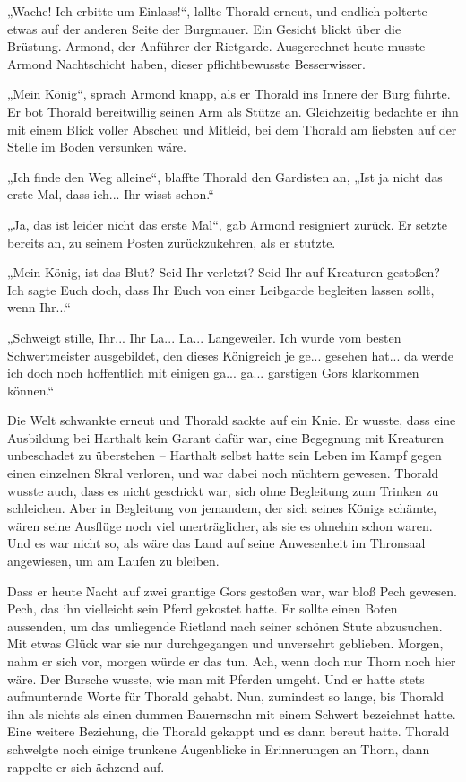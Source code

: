 \documentclass[10pt, a4paper, oneside]{book}
\begin{document}
„Wache! Ich erbitte um Einlass!“, lallte Thorald erneut, und endlich polterte etwas auf der anderen Seite der Burgmauer. Ein Gesicht blickt über die Brüstung. Armond, der Anführer der Rietgarde. Ausgerechnet heute musste Armond Nachtschicht haben, dieser pflichtbewusste Besserwisser.

„Mein König“, sprach Armond knapp, als er Thorald ins Innere der Burg führte. Er bot Thorald bereitwillig seinen Arm als Stütze an. Gleichzeitig bedachte er ihn mit einem Blick voller Abscheu und Mitleid, bei dem Thorald am liebsten auf der Stelle im Boden versunken wäre.

„Ich finde den Weg alleine“, blaffte Thorald den Gardisten an, „Ist ja nicht das erste Mal, dass ich... Ihr wisst schon.“

„Ja, das ist leider nicht das erste Mal“, gab Armond resigniert zurück. Er setzte bereits an, zu seinem Posten zurückzukehren, als er stutzte.

„Mein König, ist das Blut? Seid Ihr verletzt? Seid Ihr auf Kreaturen gestoßen? Ich sagte Euch doch, dass Ihr Euch von einer Leibgarde begleiten lassen sollt, wenn Ihr...“

„Schweigt stille, Ihr... Ihr La... La... Langeweiler. Ich wurde vom besten Schwertmeister ausgebildet, den dieses Königreich je ge... gesehen hat... da werde ich doch noch hoffentlich mit einigen ga... ga... garstigen Gors klarkommen können.“

Die Welt schwankte erneut und Thorald sackte auf ein Knie. Er wusste, dass eine Ausbildung bei Harthalt kein Garant dafür war, eine Begegnung mit Kreaturen unbeschadet zu überstehen – Harthalt selbst hatte sein Leben im Kampf gegen einen einzelnen Skral verloren, und war dabei noch nüchtern gewesen. Thorald wusste auch, dass es nicht geschickt war, sich ohne Begleitung zum Trinken zu schleichen. Aber in Begleitung von jemandem, der sich seines Königs schämte, wären seine Ausflüge noch viel unerträglicher, als sie es ohnehin schon waren. Und es war nicht so, als wäre das Land auf seine Anwesenheit im Thronsaal angewiesen, um am Laufen zu bleiben.

Dass er heute Nacht auf zwei grantige Gors gestoßen war, war bloß Pech gewesen. Pech, das ihn vielleicht sein Pferd gekostet hatte. Er sollte einen Boten aussenden, um das umliegende Rietland nach seiner schönen Stute abzusuchen. Mit etwas Glück war sie nur durchgegangen und unversehrt geblieben. Morgen, nahm er sich vor, morgen würde er das tun. Ach, wenn doch nur Thorn noch hier wäre. Der Bursche wusste, wie man mit Pferden umgeht. Und er hatte stets aufmunternde Worte für Thorald gehabt. Nun, zumindest so lange, bis Thorald ihn als nichts als einen dummen Bauernsohn mit einem Schwert bezeichnet hatte. Eine weitere Beziehung, die Thorald gekappt und es dann bereut hatte. Thorald schwelgte noch einige trunkene Augenblicke in Erinnerungen an Thorn, dann rappelte er sich ächzend auf.
\end{document}
